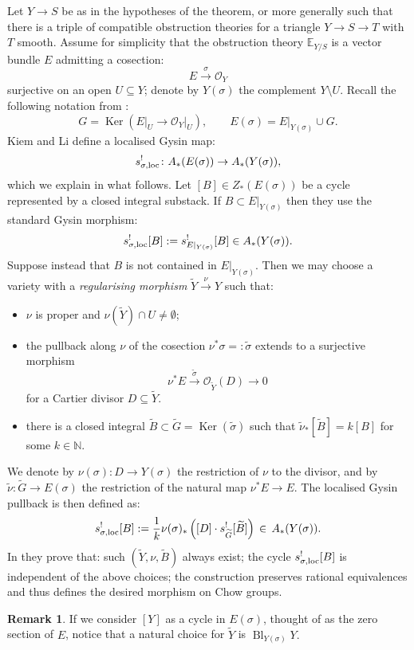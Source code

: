 \documentclass[11pt]{amsart}
\newcommand{\OO}{\mathcal O}
\renewcommand{\to}{\rightarrow}
\theoremstyle{plain}
\theoremstyle{definition}
\newtheorem{remark}[thm]{Remark}
\begin{document}
Let $Y\to S$ be as in the hypotheses of the theorem, or more generally such that there is a triple of compatible obstruction theories for a triangle $Y\to S\to T$ with $T$ smooth. Assume for simplicity that the obstruction theory $\mathbb E_{Y/S}$ is a vector bundle $E$  admitting a cosection:
\[E\xrightarrow{\sigma}\OO_Y\]
surjective on an open $U\subseteq Y$; denote by $Y(\sigma)$ the complement $Y\setminus U.$ Recall the following notation from \cite{KLcosection}:
\[G=\operatorname{Ker}\left(E\rvert_U\to\OO_Y\rvert_U\right),\qquad E(\sigma)=E\rvert_{Y(\sigma)}\cup G.\]
 Kiem and Li define a localised Gysin map:
 \[s^!_{\sigma,\rm{loc}}\colon A_*(E(\sigma))\to A_*(Y(\sigma)),\]
 which we explain in what follows.
 Let $[B]\in Z_*(E(\sigma))$ be a cycle represented by a closed integral substack. If $B\subset  E\rvert_{Y(\sigma)}$ then
  they use the standard Gysin morphism: \[s^!_{\sigma,\rm{loc}}[B]:=s^!_{E\rvert_{Y(\sigma)}}[B]\in A_*(Y(\sigma)).\]
 Suppose instead that $B$ is not contained in $E\rvert_{Y(\sigma)}.$ Then we may choose a variety with a \emph{regularising morphism} $\widetilde{Y}\xrightarrow{\nu} Y$ such that:
 \begin{itemize}\label{cond:deflocal}
 \item $\nu$ is proper and $\nu(\widetilde{Y})\cap U\neq\emptyset$;
 \item the pullback along $\nu$ of the cosection $\nu^*\sigma=:\tilde{\sigma}$ extends to a surjective morphism
 \[\nu^*E\xrightarrow{\tilde{\sigma}}\OO_{\widetilde{Y}}(D)\to 0\]
 for a Cartier divisor $D\subseteq \widetilde{Y}.$
 \item there is a closed integral $\widetilde{B}\subset\widetilde{G}=\operatorname{Ker}(\tilde{\sigma})$ such that $\tilde{\nu}_*[\widetilde{B}]=k[B]$ for some $k\in\mathbb N.$
 \end{itemize}
 We denote by  $\nu(\sigma)\colon D\to Y(\sigma)$ the restriction of $\nu$ to the divisor, and by $\tilde{\nu}\colon\widetilde{G}\to E(\sigma)$ the restriction of the natural map $\nu^*E\to E.$
 The localised Gysin pullback is then defined as:
 \[s^!_{\sigma,\rm{loc}}[B]:=\frac{1}{k} \nu(\sigma)_*\left([D]\cdot s^!_{\widetilde{G}}[\widetilde{B}]\right)\,\in\,A_*(Y(\sigma)).\]
 In \cite[\S~2]{KLcosection} they prove that: such $(\widetilde{Y},\nu,\widetilde B)$ always exist; the cycle $s^!_{\sigma,\rm{loc}}[B]$ is independent of the above choices; the construction preserves rational equivalences and thus defines the desired morphism on Chow groups.
 \begin{remark}
 If we consider $[Y]$ as a cycle in $E(\sigma)$, thought of as the zero section of $E$, notice that a natural choice for $\widetilde{Y}$ is $\operatorname{Bl}_{Y(\sigma)}Y.$
 \end{remark}
\end{document}
